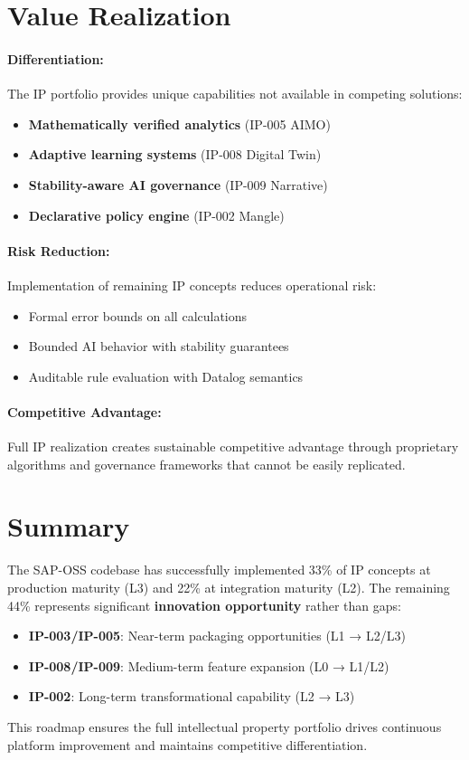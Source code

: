 \section{Value Realization}

\paragraph{Differentiation:}
The IP portfolio provides unique capabilities not available in competing solutions:
\begin{itemize}[nosep]
    \item \textbf{Mathematically verified analytics} (IP-005 AIMO)
    \item \textbf{Adaptive learning systems} (IP-008 Digital Twin)
    \item \textbf{Stability-aware AI governance} (IP-009 Narrative)
    \item \textbf{Declarative policy engine} (IP-002 Mangle)
\end{itemize}

\paragraph{Risk Reduction:}
Implementation of remaining IP concepts reduces operational risk:
\begin{itemize}[nosep]
    \item Formal error bounds on all calculations
    \item Bounded AI behavior with stability guarantees
    \item Auditable rule evaluation with Datalog semantics
\end{itemize}

\paragraph{Competitive Advantage:}
Full IP realization creates sustainable competitive advantage through proprietary algorithms and governance frameworks that cannot be easily replicated.

\section{Summary}

The SAP-OSS codebase has successfully implemented 33\% of IP concepts at production maturity (L3) and 22\% at integration maturity (L2). The remaining 44\% represents significant \textbf{innovation opportunity} rather than gaps:

\begin{itemize}[nosep]
    \item \textbf{IP-003/IP-005}: Near-term packaging opportunities (L1 → L2/L3)
    \item \textbf{IP-008/IP-009}: Medium-term feature expansion (L0 → L1/L2)
    \item \textbf{IP-002}: Long-term transformational capability (L2 → L3)
\end{itemize}

This roadmap ensures the full intellectual property portfolio drives continuous platform improvement and maintains competitive differentiation.